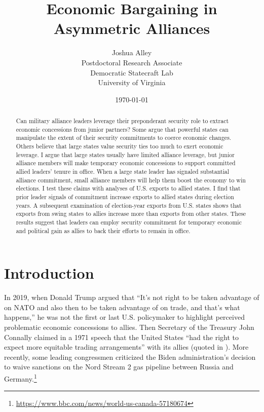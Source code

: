 \documentclass[12pt]{article}
\title{\textbf{Economic Bargaining in Asymmetric Alliances}}
\author{
Joshua Alley\\
Postdoctoral Research Associate\\
Democratic Statecraft Lab\\
University of Virginia 
}
\date{\today}
\begin{document}
\maketitle 

\begin{abstract}
Can military alliance leaders leverage their preponderant security role to extract economic concessions from junior partners?
Some argue that powerful states can manipulate the extent of their security commitments to coerce economic changes. 
Others believe that large states value security ties too much to exert economic leverage.  
I argue that large states usually have limited alliance leverage, but junior alliance members will make temporary economic concessions to support committed allied leaders' tenure in office.
When a large state leader has signaled substantial alliance commitment, small alliance members will help them boost the economy to win elections.  
I test these claims with analyses of U.S. exports to allied states. 
I find that prior leader signals of commitment increase exports to allied states during election years. 
A subsequent examination of election-year exports from U.S. states shows that exports from swing states to allies increase more than exports from other states. 
These results suggest that leaders can employ security commitment for temporary economic and political gain as allies to back their efforts to remain in office.
\end{abstract} 


\newpage 
\doublespace 


\section{Introduction}

In 2019, when Donald Trump argued that ``It's not right to be taken advantage of on NATO and also then to be taken advantage of on trade, and that's what happens,'' he was not the first or last U.S. policymaker to highlight perceived problematic economic concessions to allies.
Then Secretary of the Treasury John Connally claimed in a 1971 speech that the United States ``had the right to expect more equitable trading arrangements'' with its allies (quoted in \citet[pg 175]{Sayle2019}).
More recently, some leading congressmen criticized the Biden administration's decision to waive sanctions on the Nord Stream 2 gas pipeline between Russia and Germany.\footnote{\url{https://www.bbc.com/news/world-us-canada-57180674}}
\end{document}
